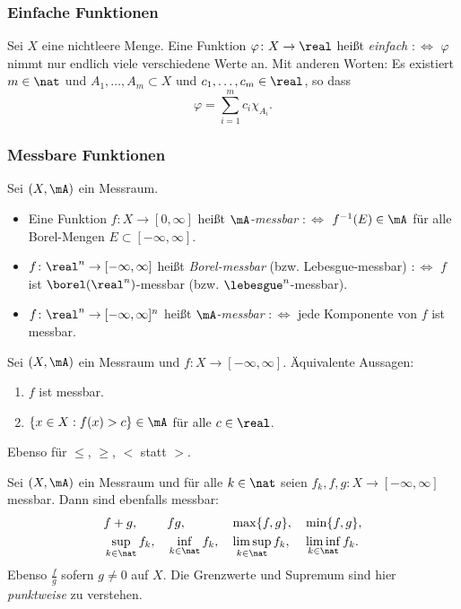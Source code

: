 \subsubsection{Einfache Funktionen}
Sei $X$ eine nichtleere Menge. Eine Funktion $\varphi\colon X \to \real$ heißt \emph{einfach} $:\Leftrightarrow$ $\varphi$ nimmt nur endlich viele verschiedene Werte an. Mit anderen Worten: Es existiert $m \in \nat$ und $A_1, \ldots, A_m \subset X$ und $c_1, \ldots, c_m \in \real$, so dass
\[ \varphi = \sum_{i=1}^m c_i \chi_{A_i}. \]

\subsubsection{Messbare Funktionen}
Sei $(X, \mA)$ ein Messraum.
\begin{itemize}
 \item Eine Funktion $f\colon X \to [0, \infty]$ heißt \emph{$\mA$-messbar} $:\Leftrightarrow$ $f^{-1}(E) \in \mA$ für alle Borel-Mengen $E \subset [-\infty,\infty]$.
 \item $f\colon\real^n \to [-\infty,\infty]$ heißt \emph{Borel-messbar} (bzw. Lebesgue-messbar) $:\Leftrightarrow$ $f$ ist $\borel(\real^n)$-messbar (bzw. $\lebesgue^n$-messbar).
 \item $f\colon\real^n \to [-\infty,\infty]^n$ heißt \emph{$\mA$-messbar} $:\Leftrightarrow$ jede Komponente von $f$ ist messbar.
\end{itemize}

\begin{rmrk}
 Sei $(X, \mA)$ ein Messraum und $f\colon X \to [-\infty,\infty]$. Äquivalente Aussagen:
 \begin{enumerate}
  \item $f$ ist messbar.
  \item $\{ x \in X: f(x) > c \} \in \mA$ für alle $c \in \real$.
 \end{enumerate}
 Ebenso für $\le$, $\ge$, $<$ statt $>$.
\end{rmrk}

\begin{thm}
 Sei $(X, \mA)$ ein Messraum und für alle $k \in \nat$ seien $f_k, f, g\colon X \to [-\infty,\infty]$ messbar. Dann sind ebenfalls messbar:
 \begin{align*}
 &f+g,& &fg,& &\max\{ f, g \},& &\min\{ f, g \}, \\ 
 &\sup_{k \in \nat} f_k, & &\inf_{k \in \nat} f_k,& &\limsup_{k \in \nat} f_k,& &\liminf_{k \in \nat} f_k.
 \end{align*}
 Ebenso $\frac{f}{g}$ sofern $g \ne 0$ auf $X$. Die Grenzwerte und Supremum sind hier \emph{punktweise} zu verstehen.
\end{thm}

